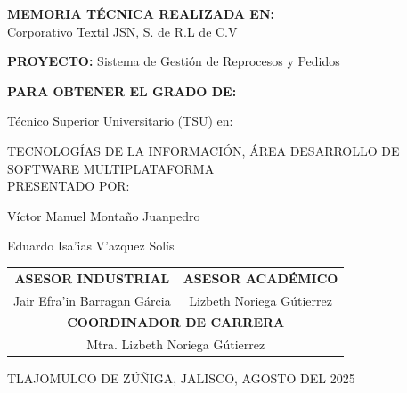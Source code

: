 \documentclass[12pt,letterpaper,spanish]{report}
\begin{document}
\begin{center}

\large{\textbf{MEMORIA TÉCNICA REALIZADA EN:}}
 \\  Corporativo Textil JSN, S. de R.L de C.V

\centerline{\hbox{}}

\large{\textbf{PROYECTO:} Sistema de Gestión de Reprocesos y Pedidos}

\vspace{0.1in}
\large{\textbf{PARA OBTENER EL GRADO DE:}}

\large{Técnico Superior Universitario (TSU) en:}
\vspace{0.05in}

\large{TECNOLOGÍAS DE LA INFORMACIÓN, ÁREA DESARROLLO DE SOFTWARE MULTIPLATAFORMA }
\\
\large{PRESENTADO POR:}


Víctor Manuel Montaño Juanpedro %


Eduardo Isa'ias V'azquez Solís %

\vspace{0.5in}

\begin{tabular}{cc}
    \textbf{ASESOR INDUSTRIAL} & \textbf{ASESOR ACADÉMICO} \\

    Jair Efra'in Barragan Gárcia & Lizbeth Noriega Gútierrez \\
    \multicolumn{2}{c}{\textbf{COORDINADOR DE CARRERA}
    \vspace{0.4in}
    } \\

    \multicolumn{2}{c}{
            Mtra. Lizbeth Noriega Gútierrez }
    \end{tabular}

\end{center}
\begin{flushright}\small{ TLAJOMULCO DE ZÚÑIGA, JALISCO, AGOSTO DEL 2025} \end{flushright}

\newpage


\end{document}
